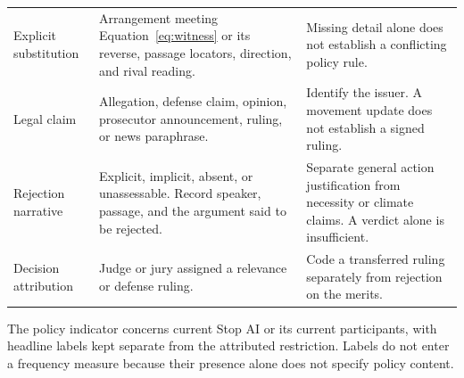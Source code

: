 \documentclass[11pt]{article}
\begin{document}
\begin{longtable}{P{0.17\textwidth}P{0.36\textwidth}P{0.38\textwidth}}
Explicit substitution & Arrangement meeting Equation~\ref{eq:witness} or its reverse, passage locators, direction, and rival reading. & Missing detail alone does not establish a conflicting policy rule.\\
Legal claim & Allegation, defense claim, opinion, prosecutor announcement, ruling, or news paraphrase. & Identify the issuer. A movement update does not establish a signed ruling.\\
Rejection narrative & Explicit, implicit, absent, or unassessable. Record speaker, passage, and the argument said to be rejected. & Separate general action justification from necessity or climate claims. A verdict alone is insufficient.\\
Decision attribution & Judge or jury assigned a relevance or defense ruling. & Code a transferred ruling separately from rejection on the merits.\\
\end{longtable}
\endgroup

The policy indicator concerns current Stop AI or its current participants, with headline labels kept separate from the attributed restriction. Labels do not enter a frequency measure because their presence alone does not specify policy content.

\clearpage
\end{document}
